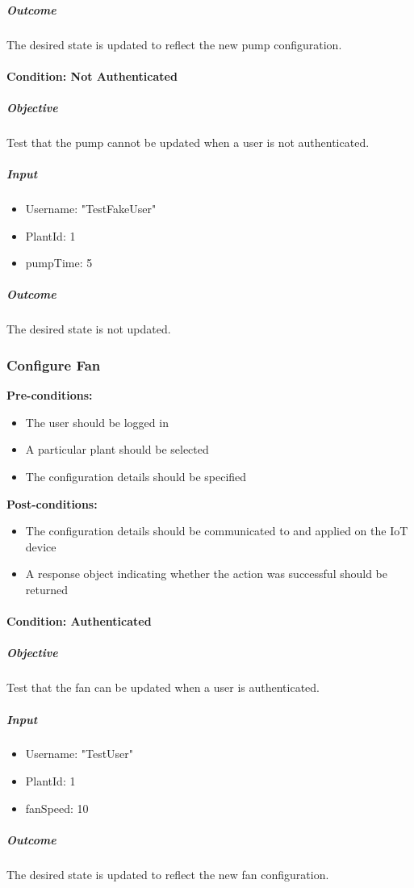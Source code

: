 \documentclass{article}
\begin{document}
	\subparagraph{Outcome}
	The desired state is updated to reflect the new pump configuration.
	
	\paragraph{Condition: Not Authenticated}
	\subparagraph{Objective}
	Test that the pump cannot be updated when a user is not authenticated.
	\subparagraph{Input}
	\begin{itemize}
		\item Username: "TestFakeUser"
		\item PlantId: 1
		\item pumpTime: 5
	\end{itemize}
	
	\subparagraph{Outcome}
	The desired state is not updated.
	
	\subsubsection{Configure Fan}
	\textbf{Pre-conditions:}
	\begin{itemize}
		\item The user should be logged in
		\item A particular plant should be selected
		\item The configuration details should be specified
	\end{itemize}
	\textbf{Post-conditions:}
	\begin{itemize}
		\item The configuration details should be communicated to and applied on the IoT device
		\item A response object indicating whether the action was successful should be returned
	\end{itemize}
	
	\paragraph{Condition: Authenticated}
	\subparagraph{Objective}
	Test that the fan can be updated when a user is authenticated.
	\subparagraph{Input}
	\begin{itemize}
		\item Username: "TestUser"
		\item PlantId: 1
		\item fanSpeed: 10
	\end{itemize}
	
	\subparagraph{Outcome}
	The desired state is updated to reflect the new fan configuration.
	
\end{document}
